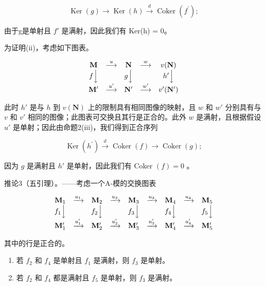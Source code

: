 \[
\operatorname{Ker} (g) \longrightarrow \operatorname{Ker} (h) \xrightarrow {d} \operatorname{Coker} \left(f ^ {\prime}\right);
\]

由于g是单射且 \(f'\) 是满射，因此我们有 Ker(h) = 0。

为证明(ii)，考虑如下图表。

\[
\begin{array}{c c c c c} \mathbf {M} & \stackrel {{u}} {{\longrightarrow}} & \mathbf {N} & \stackrel {{w}} {{\longrightarrow}} & v (\mathbf {N}) \\ f \Big \downarrow & & g \Big \downarrow & & h ^ {\prime} \Big \downarrow \\ \mathbf {M} ^ {\prime} & \stackrel {{u ^ {\prime}}} {{\longrightarrow}} & \mathbf {N} ^ {\prime} & \stackrel {{w ^ {\prime}}} {{\longrightarrow}} & v ^ {\prime} (\mathbf {N} ^ {\prime}) \end{array}
\]

此时 \(h'\) 是与 \(h\) 到 \(v(\mathbf{N})\) 上的限制具有相同图像的映射，且 \(w\) 和 \(w'\) 分别具有与 \(v\) 和 \(v'\) 相同的图像；此图表可交换且其行是正合的。此外 \(w\) 是满射，且根据假设 \(u'\) 是单射；因此由命题2(iii)，我们得到正合序列

\[
\operatorname{Ker} \left(h ^ {\prime}\right) \xrightarrow {d} \operatorname{Coker} (f) \longrightarrow \operatorname{Coker} (g);
\]

因为 \(g\) 是满射且 \(h'\) 是单射，因此我们有 Coker \((f) = 0\) 。

推论3（五引理）。——考虑一个A-模的交换图表

\[
\begin{array}{c c c c c c c c c} \mathbf {M} _ {1} & \xrightarrow {u _ {1}} & \mathbf {M} _ {2} & \xrightarrow {u _ {2}} & \mathbf {M} _ {3} & \xrightarrow {u _ {3}} & \mathbf {M} _ {4} & \xrightarrow {u _ {4}} & \mathbf {M} _ {5} \\ f _ {1} \Big \downarrow & & f _ {2} \Big \downarrow & & f _ {3} \Big \downarrow & & f _ {4} \Big \downarrow & & f _ {5} \Big \downarrow \\ \mathbf {M} _ {1} ^ {\prime} & \xrightarrow {u _ {1} ^ {\prime}} & \mathbf {M} _ {2} ^ {\prime} & \xrightarrow {u _ {2} ^ {\prime}} & \mathbf {M} _ {3} ^ {\prime} & \xrightarrow {u _ {3} ^ {\prime}} & \mathbf {M} _ {4} ^ {\prime} & \xrightarrow {u _ {4} ^ {\prime}} & \mathbf {M} _ {5} ^ {\prime} \end{array}
\]

其中的行是正合的。

\begin{enumerate}
\def\labelenumi{(\roman{enumi})}
\item
  若 \(f_{2}\) 和 \(f_{4}\) 是单射且 \(f_{1}\) 是满射，则 \(f_{3}\) 是单射。
\item
  若 \(f_{2}\) 和 \(f_{4}\) 都是满射且 \(f_{5}\) 是单射，则 \(f_{3}\) 是满射。
\end{enumerate}

